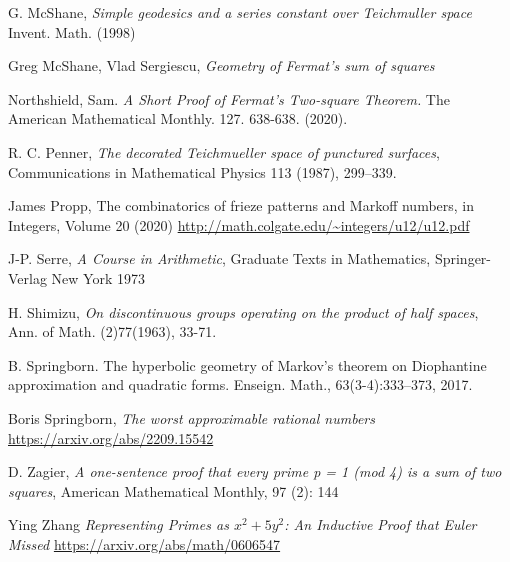 \documentclass[12pt,a4paper]{amsart}
\begin{document}


G. McShane,
\textit{Simple geodesics and a series constant over Teichmuller space}
Invent. Math. (1998)

Greg McShane, Vlad Sergiescu,
\textit{Geometry of Fermat's sum of squares}

Northshield, Sam. 
\textit{A Short Proof of Fermat’s Two-square Theorem.} The American Mathematical Monthly. 127. 638-638. (2020). 


R. C. Penner, 
\textit{The decorated Teichmueller space of punctured surfaces}, 
Communications in Mathematical Physics 113 (1987), 299–339.


James Propp,
The combinatorics of frieze patterns and Markoff numbers,
in  Integers, Volume 20 (2020)
\url{http://math.colgate.edu/~integers/u12/u12.pdf}


J-P. Serre,
\textit{A Course in Arithmetic},
Graduate Texts in Mathematics,
Springer-Verlag New York
1973

H. Shimizu, 
\textit{On discontinuous groups operating on the product of half spaces}, Ann. of Math. (2)77(1963), 33-71.



B. Springborn. The hyperbolic geometry of Markov’s theorem on Diophantine
approximation and quadratic forms. Enseign. Math., 63(3-4):333–373, 2017.

Boris Springborn,
\textit{The worst approximable rational numbers}
\url{https://arxiv.org/abs/2209.15542}



D. Zagier,
 \textit{A one-sentence proof that every prime p = 1 (mod 4) is a sum of two squares}, 
 American Mathematical Monthly, 97 (2): 144
 
Ying Zhang
\textit{Representing Primes as $x^2 + 5y^2$: An Inductive Proof that Euler Missed}
\url{https://arxiv.org/abs/math/0606547}


 
\end{document}
